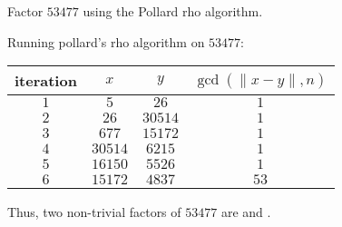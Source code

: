 \begin{problem}
  Factor $53477$ using the Pollard rho algorithm.
\end{problem}

\begin{Answer}

Running pollard's rho algorithm on $53477$:
\bigskip

\centering
\begin{tabular}{||c | c | c || c ||} 
\hline
  iteration & $x$ & $y$ & $\gcd (\| x-y \|, n)$\\
\hline
  $1$ & $5$ & $26$ & $1$\\
\hline
  $2$ & $26$ & $30514$ & $1$\\
\hline
  $3$ & $677$ & $15172$ & $1$\\
\hline
  $4$ & $30514$ & $6215$ & $1$\\
\hline
  $5$ & $16150$ & $5526$ & $1$\\
\hline
  $6$ & $15172$ & $4837$ & $53$\\[1ex]
\hline
\end{tabular}

\flushleft{}

Thus, two non-trivial factors of $53477$ are  and .
\end{Answer}
